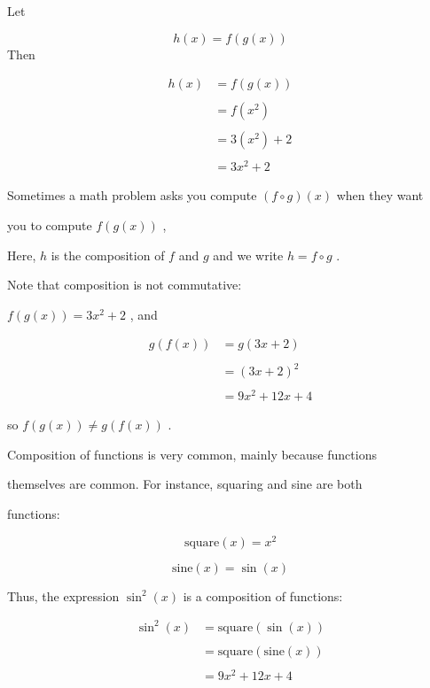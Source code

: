 Let



$$h(x)=f(g(x))$$ Then



\begin{align} h(x) &= f(g(x)) \\\\ &= f(x^2) \\\\ &= 3(x^2)+2 \\\\ &= 3x^2+2 \end{align} 



Sometimes a math problem asks you compute $(f\circ g)(x)$ when they want

you to compute $f(g(x))$ ,



Here, $h$ is the composition of $f$ and $g$ and we write $h=f\circ g$ .

Note that composition is not commutative:



$f(g(x))=3x^2+2$ , and



\begin{align} g(f(x)) &= g(3x+2) \\\\ &= (3x+2)^2 \\\\ &= 9x^2+12x+4 \end{align}



so $f(g(x))\ne g(f(x))$ .



Composition of functions is very common, mainly because functions

themselves are common. For instance, squaring and sine are both

functions:



$$\text{square}(x)=x^2$$



$$\text{sine}(x)=\sin(x)$$



Thus, the expression $\sin^2(x)$ is a composition of functions:



\begin{align} \sin^2(x) &=\text{square}(\sin(x)) \\\\ &=\text{square}(\text{sine}(x)) \\\\ &= 9x^2+12x+4 \end{align}



